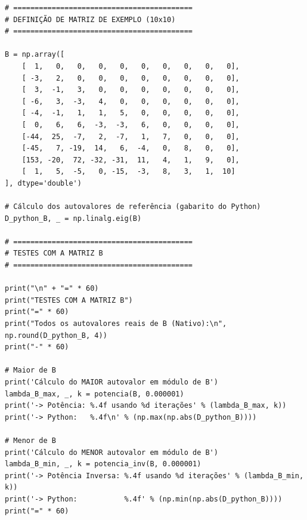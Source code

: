 \documentclass[../numerical_methods.tex]{subfiles}
\begin{document}
\begin{listing}[H]
	\begin{verbatim}
# ==========================================
# DEFINIÇÃO DE MATRIZ DE EXEMPLO (10x10)
# ==========================================

B = np.array([
    [  1,   0,   0,   0,   0,   0,   0,   0,   0,   0],
    [ -3,   2,   0,   0,   0,   0,   0,   0,   0,   0],
    [  3,  -1,   3,   0,   0,   0,   0,   0,   0,   0],
    [ -6,   3,  -3,   4,   0,   0,   0,   0,   0,   0],
    [ -4,  -1,   1,   1,   5,   0,   0,   0,   0,   0],
    [  0,   6,   6,  -3,  -3,   6,   0,   0,   0,   0],
    [-44,  25,  -7,   2,  -7,   1,   7,   0,   0,   0],
    [-45,   7, -19,  14,   6,  -4,   0,   8,   0,   0],
    [153, -20,  72, -32, -31,  11,   4,   1,   9,   0],
    [  1,   5,  -5,   0, -15,  -3,   8,   3,   1,  10]
], dtype='double')

# Cálculo dos autovalores de referência (gabarito do Python)
D_python_B, _ = np.linalg.eig(B)

# ==========================================
# TESTES COM A MATRIZ B
# ==========================================

print("\n" + "=" * 60)
print("TESTES COM A MATRIZ B")
print("=" * 60)
print("Todos os autovalores reais de B (Nativo):\n", np.round(D_python_B, 4))
print("-" * 60)

# Maior de B
print('Cálculo do MAIOR autovalor em módulo de B')
lambda_B_max, _, k = potencia(B, 0.000001)
print('-> Potência: %.4f usando %d iterações' % (lambda_B_max, k))
print('-> Python:   %.4f\n' % (np.max(np.abs(D_python_B))))

# Menor de B
print('Cálculo do MENOR autovalor em módulo de B')
lambda_B_min, _, k = potencia_inv(B, 0.000001)
print('-> Potência Inversa: %.4f usando %d iterações' % (lambda_B_min, k))
print('-> Python:           %.4f' % (np.min(np.abs(D_python_B))))
print("=" * 60)
\end{verbatim}
\end{listing}
\end{document}
